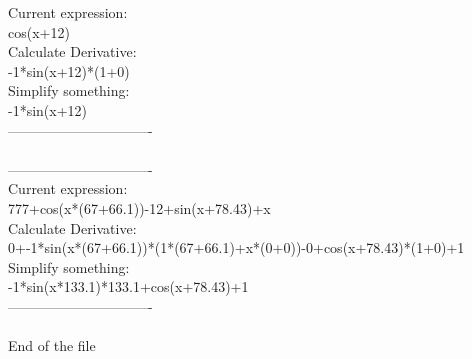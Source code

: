 \documentclass[12pt]{article}
\begin{document}
Current expression:\\
cos(x+12)\\
Calculate Derivative:\\
-1*sin(x+12)*(1+0)\\
Simplify something:\\
-1*sin(x+12)\\
-------------------------------\\
\\
-------------------------------\\
Current expression:\\
777+cos(x*(67+66.1))-12+sin(x+78.43)+x\\
Calculate Derivative:\\
0+-1*sin(x*(67+66.1))*(1*(67+66.1)+x*(0+0))-0+cos(x+78.43)*(1+0)+1\\
Simplify something:\\
-1*sin(x*133.1)*133.1+cos(x+78.43)+1\\
-------------------------------\\
\\

        End of the file
        
\end{document}

